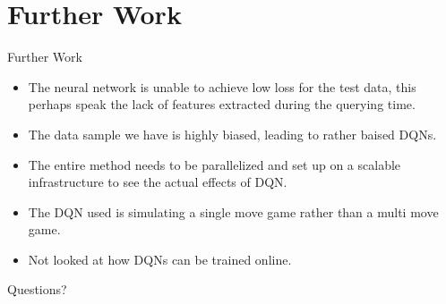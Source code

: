 \section{Further Work}
\frame{\sectionpage}

\begin{frame}{Further Work}
    \begin{itemize}
        \item The neural network is unable to achieve low loss for the test data, this perhaps speak the lack of features extracted during the querying time.
        \item The data sample we have is highly biased, leading to rather baised DQNs.
        \item The entire method needs to be parallelized and set up on a scalable infrastructure to see the actual effects of DQN.
        \item The DQN used is simulating a single move game rather than a multi move game.
        \item Not looked at how DQNs can be trained online.
    \end{itemize}
\end{frame}

\begin{frame}{}
    \begin{center}
        Questions?
    \end{center}
\end{frame}

